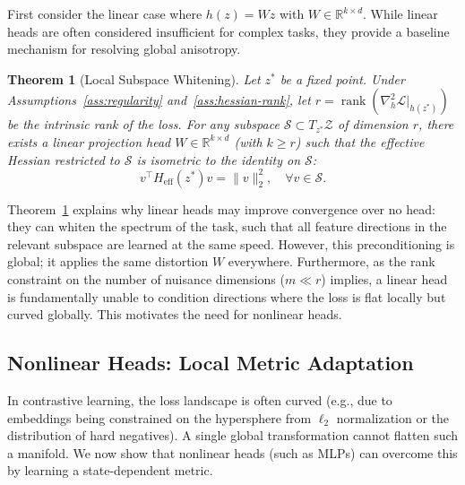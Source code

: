 \documentclass{article}
\theoremstyle{plain}
\newtheorem{theorem}{Theorem}[section]
\theoremstyle{definition}
\theoremstyle{remark}
\begin{document}
First consider the linear case where $h(z) = Wz$ with $W \in \mathbb{R}^{k \times d}$. While linear heads are often considered insufficient for complex tasks, they provide a baseline mechanism for resolving global anisotropy.

\begin{theorem}[Local Subspace Whitening]
\label{thm:linear-whitening}
Let $z^*$ be a fixed point. Under Assumptions~\ref{ass:regularity} and~\ref{ass:hessian-rank}, let $r = \operatorname{rank}(\nabla_h^2 \mathcal{L}|_{h(z^*)})$ be the intrinsic rank of the loss. For any subspace $\mathcal{S} \subset T_{z^*} \mathcal{Z}$ of dimension $r$, there exists a linear projection head $W \in \mathbb{R}^{k \times d}$ (with $k \ge r$) such that the effective Hessian restricted to $\mathcal{S}$ is isometric to the identity on $\mathcal{S}$:
\begin{equation*}
    v^\top H_{\text{eff}}(z^*) v = \|v\|_2^2, \quad \forall v \in \mathcal{S}.
\end{equation*}
\end{theorem}

Theorem~\ref{thm:linear-whitening} explains why linear heads may improve convergence over no head: they can whiten the spectrum of the task, such that all feature directions in the relevant subspace are learned at the same speed. However, this preconditioning is global; it applies the same distortion $W$ everywhere. Furthermore, as the rank constraint on the number of nuisance dimensions ($m \ll r$) implies, a linear head is fundamentally unable to condition directions where the loss is flat locally but curved globally. This motivates the need for nonlinear heads.

\subsection{Nonlinear Heads: Local Metric Adaptation}
\label{sec:nonlinear-head-metric-adapt}

In contrastive learning, the loss landscape is often curved (e.g., due to embeddings being constrained on the hypersphere from $\ell_2$ normalization or the distribution of hard negatives). A single global transformation cannot flatten such a manifold. We now show that nonlinear heads (such as MLPs) can overcome this by learning a state-dependent metric.
\end{document}
